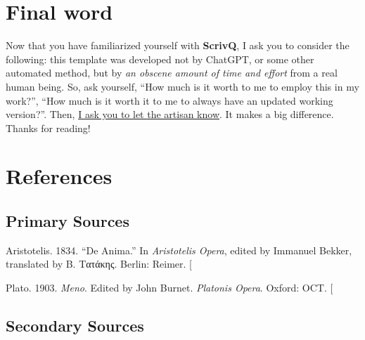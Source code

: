 \documentclass[
  12pt,
  a4paper,
  oneside,
  numbers=noenddot,
  titlepage,
  toclink=all,
  toc=bibliography]{scrbook}
\newlength{\cslhangindent}
\newlength{\cslentryspacingunit} %
\newenvironment{CSLReferences}[2] %
 {%
  \setlength{\parindent}{0pt}
  \ifodd #1
  \let\oldpar\par
  \def\par{\hangindent=\cslhangindent\oldpar}
  \fi
  \setlength{\parskip}{#2\cslentryspacingunit}
 }%
 {}
\theoremstyle{definition}
\theoremstyle{definition}
\theoremstyle{definition}
\theoremstyle{plain}
\theoremstyle{plain}
\theoremstyle{plain}
\theoremstyle{plain}
\theoremstyle{plain}
\theoremstyle{remark}
\begin{document}
\newpage{}

\hypertarget{sec-scriv68}{%
\chapter{Final word}\label{sec-scriv68}}

Now that you have familiarized yourself with \textbf{ScrivQ}, I ask you
to consider the following: this template was developed not by ChatGPT,
or some other automated method, but by \emph{an obscene amount of time
and effort} from a real human being. So, ask yourself, \enquote{How much
is it worth to me to employ this in my work?}, \enquote{How much is it
worth it to me to always have an updated working version?}. Then,
\href{https://github.com/sponsors/bcdavasconcelos}{I ask you to let the
artisan know}. It makes a big difference. Thanks for reading!

\hypertarget{sec-scriv69}{%
\chapter{References}\label{sec-scriv69}}

\hypertarget{sec-scriv70}{%
\section{Primary Sources}\label{sec-scriv70}}

\hypertarget{refs_scriv70}{}
\begin{CSLReferences}{1}{0}
\leavevmode{}%
Aristotelis. 1834. {``De Anima.''} In \emph{Aristotelis Opera}, edited
by Immanuel Bekker, translated by Β. Τατάκης. Berlin: Reimer.
{[}\Acrobatmenu{GoBack}{$\hookleftarrow$}{]}

\leavevmode{}%
Plato. 1903. \emph{Meno}. Edited by John Burnet. \emph{Platonis Opera}.
Oxford: OCT. {[}\Acrobatmenu{GoBack}{$\hookleftarrow$}{]}

\end{CSLReferences}

\hypertarget{sec-scriv117}{%
\section{Secondary Sources}\label{sec-scriv117}}
\end{document}
